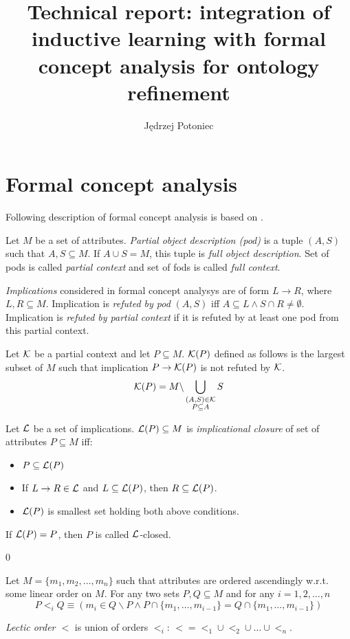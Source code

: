\documentclass{llncs}
\title{Technical report: integration of inductive learning with formal concept analysis for ontology refinement}
\author{Jędrzej Potoniec}
\institute{Poznan University of Technology}
\newcommand{\pc}{\ensuremath\mathcal{K}}
\newcommand{\soi}{\ensuremath\mathcal{L}}
\begin{document}
\maketitle
\begin{abstract}
\end{abstract}

\section{Formal concept analysis}

Following description of formal concept analysis is based on \cite{baader2007completing}.

Let $M$ be a set of attributes. \emph{Partial object description (pod)} is a
tuple $(A,S)$ such that $A,S\subseteq M$. If $A\cup S=M$, this tuple is
\emph{full object description}. Set of pods is called \emph{partial context}
and set of fods is called \emph{full context}.

\emph{Implications} considered in formal concept analysys are of form
$L\rightarrow R$, where $L,R\subseteq M$. Implication is \emph{refuted by pod}
$(A,S)$ iff $A\subseteq L \land S\cap R\neq\emptyset$. Implication is
\emph{refuted by partial context} if it is refuted by at least one pod from
this partial context.

\begin{definition}
Let $\pc$ be a partial context and let $P\subseteq M$. 
$\pc(P)$ defined as follows is the largest subset of $M$ such that implication $P\to \pc(P)$ is not refuted by $\pc$.
\[ \pc(P)=M\backslash \bigcup_{\substack{(A,S)\in\pc\\P\subseteq A}} S \]
\end{definition}

\begin{definition}
Let $\soi$ be a set of implications. $\soi(P)\subseteq M$ is \emph{implicational closure} of set of attributes $P\subseteq M$ iff:
\begin{itemize}
\item $P\subseteq\soi(P)$
\item If $L\to R\in\soi$ and $L\subseteq \soi(P)$, then $R\subseteq\soi(P)$.
\item $\soi(P)$ is smallest set holding both above conditions.
\end{itemize}
If $\soi(P)=P$, then $P$ is called $\soi$-closed.
\end{definition}
0
\begin{definition}
Let $M=\{m_1,m_2,\ldots,m_n\}$ such that attributes are ordered ascendingly w.r.t. some linear order on $M$. For any two sets $P,Q\subseteq M$ and for any $i=1,2,\ldots,n$
\[P<_i Q \equiv \left(m_i\in Q\backslash P \land P\cap \{m_1,\ldots,m_{i-1}\}=Q\cap \{m_1,\ldots,m_{i-1}\} \right) \]

\emph{Lectic order $<$} is union of orders $<_i$: $<=<_1 \cup <_2 \cup \ldots \cup <_n$.
\end{definition}
\end{document}
